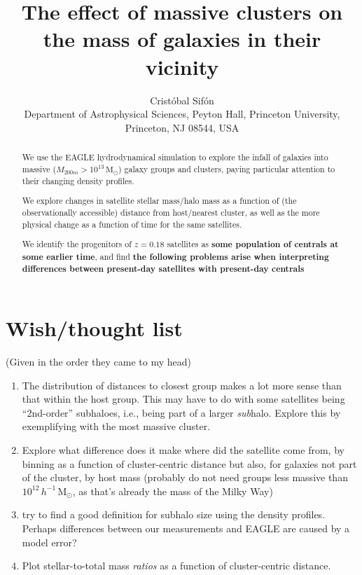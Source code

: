 \documentclass[usenatbib,fleqn]{mnras}
\title[Mass content of satellites in EAGLE]{The effect of massive clusters on the mass of galaxies in their vicinity}
\author[C.\ Sif\'on]{Crist\'obal Sif\'on
\\
Department of Astrophysical Sciences, Peyton Hall, Princeton University, Princeton, NJ 08544, USA
}
\newcommand{\Msun}{\mathrm{M}_\odot}
\begin{document}
\label{firstpage}
\pagerange{\pageref{firstpage}--\pageref{lastpage}}


\maketitle

\begin{abstract}
  We use the EAGLE hydrodynamical simulation to explore the infall of galaxies into massive ($M_{200m}>10^{13}\,\Msun$) galaxy groups and clusters, paying particular attention to their changing density profiles.
  
  We explore changes in satellite stellar mass/halo mass as a function of (the observationally accessible) distance from host/nearest cluster, as well as the more physical change as a function of time for the same satellites.
  
  We identify the progenitors of $z=0.18$ satellites as \textbf{some population of centrals at some earlier time}, and find \textbf{the following problems arise when interpreting differences between present-day satellites with present-day centrals}

\end{abstract}



\section{Wish/thought list}

(Given in the order they came to my head)

\begin{enumerate}
  \item The distribution of distances to closest group makes a lot more sense than that within the host group. This may have to do with some satellites being ``2nd-order'' subhaloes, i.e., being part of a larger \emph{sub}halo. Explore this by exemplifying with the most massive cluster.
  \item Explore what difference does it make where did the satellite come from, by binning as a function of cluster-centric distance but also, for galaxies not part of the cluster, by host mass (probably do not need groups less massive than $10^{12}\,h^{-1}\,\Msun$, as that's already the mass of the Milky Way)
  \item try to find a good definition for subhalo size using the density profiles. Perhaps differences between our measurements and EAGLE are caused by a model error?
  \item Plot stellar-to-total mass \emph{ratios} as a function of cluster-centric distance.
\end{enumerate}
\end{document}

